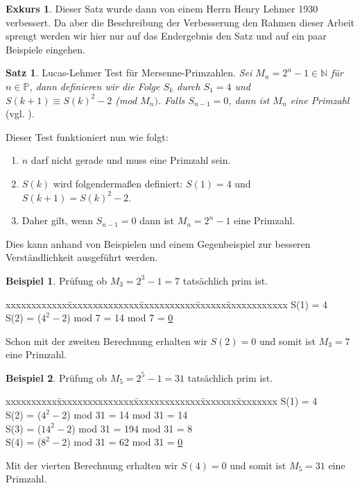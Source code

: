 \documentclass[12pt,a4paper]{article}
\theoremstyle{definition}
\newtheorem{satz}{Satz}[subsection]
\newtheorem{bsp}{Beispiel}[subsection]
\newtheorem{exkurs}{Exkurs}
\begin{document}
\begin{exkurs}
Dieser Satz wurde dann von einem Herrn Henry Lehmer 1930 verbessert.
Da aber die Beschreibung der Verbesserung den Rahmen dieser Arbeit sprengt werden wir hier nur auf das Endergebnis den Satz und auf ein paar Beispiele eingehen.
\begin{satz}{Lucas-Lehmer Test für Mersenne-Primzahlen}.\newline
\textit{Sei $M_n = 2^n-1 \in \mathbb{N}$ für $n \in \mathbb{P}$, dann definieren wir die Folge $S_k$ durch $S_1 = 4$ und $S(k + 1) \equiv S(k)^2 - 2$ (mod $M_n)$. Falls $S_{n-1} = 0$, dann ist $M_n$ eine Primzahl} (vgl. \cite[183]{Crandall2005}).
\end{satz}
Dieser Test funktioniert nun wie folgt:
\begin{enumerate}
    \item $n$ darf nicht gerade und muss eine Primzahl sein.
    \item $S(k)$ wird folgendermaßen definiert: $S(1) = 4$ und $S(k + 1) = S(k)^2 - 2$.
    \item Daher gilt, wenn $S_{n - 1} = 0$ dann ist $M_n = 2^n - 1$ eine Primzahl.
\end{enumerate}

Dies kann anhand von Beispielen und einem Gegenbeispiel zur besseren Verständlichkeit ausgeführt werden.
\begin{bsp}{Prüfung ob $M_3 = 2^3 - 1 = 7$ tatsächlich prim ist}.
\begin{tabbing}
xxxxxxxxxxxx\=xxxxxxxxxxxxxx\=xxxxxxxxxxx\=xxxxxx\=xxxxxxxxxxxx\kill
\> S(1) = 4 \\
\> S(2) = ($4^2 - 2$) \> mod 7 = 14 \> mod 7 \> = \underline{0}
\end{tabbing}
Schon mit der zweiten Berechnung erhalten wir $S(2) = 0$ und somit ist $M_3 = 7$ eine Primzahl.
\end{bsp}

\begin{bsp}{Prüfung ob $M_5 = 2^5 - 1 = 31$ tatsächlich prim ist}.
\begin{tabbing}
xxxxxxxxxx\=xxxxxxxxxxxxxxx\=xxxxxxxxxxxxx\=xxxxxxx\=xxxxxxxx\kill
\> S(1) = 4 \\
\> S(2) = ($4^2 - 2$)  \> mod 31 = 14  \> mod 31 \> = 14 \\
\> S(3) = ($14^2 - 2$) \> mod 31 = 194 \> mod 31 \> = 8 \\
\> S(4) = ($8^2 - 2$)  \> mod 31 = 62  \> mod 31 \> = \underline{0}
\end{tabbing}
Mit der vierten Berechnung erhalten wir $S(4) = 0$ und somit ist $M_5 = 31$ eine Primzahl.
\end{bsp}


\end{exkurs}
\end{document}
